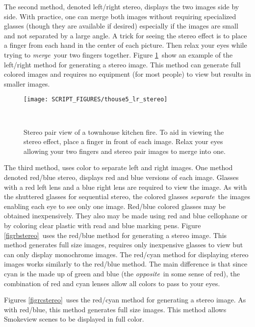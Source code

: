 \documentclass[11pt,twoside]{book}
\begin{document}
The second method, denoted left/right stereo, displays the two
images side by side.  With practice, one can merge both images
without requiring specialized glasses (though they are available
if desired) especially if the images are small and not separated
by a large angle. A trick for seeing the stereo effect is to place
a finger from each hand in the center of each picture.  Then relax
your eyes while trying to {\em merge}\ your two fingers together.
Figure \ref{figlrstereo}\ show an example of the left/right method
for generating a stereo image.  This method can generate full
colored images and requires no equipment (for most people) to view
but results in smaller images.
\begin{figure}[bph]
\begin{center}
\texttt{[image: SCRIPT\_FIGURES/thouse5\_lr\_stereo]}
\caption[Stereo pair view of a townhouse kitchen fire.]{ Stereo
pair view of a townhouse kitchen fire. To aid in viewing the
stereo effect, place a finger in front of each image.  Relax your
eyes allowing your two fingers and stereo pair images to merge
into one. }\ \label{figlrstereo}
\end{center}
\end{figure}

The third method, uses color to separate left and right images.
One method denoted red/blue stereo, displays red and blue versions
of each image.  Glasses with a red left lens and a blue right lens
are required to view the image.  As with the shuttered glasses for
sequential stereo, the colored glasses {\em separate}\ the images
enabling each eye to see only one image.  Red/blue colored glasses
may be obtained inexpensively. They also may be made using
red and blue cellophane or by coloring clear plastic with read and
blue marking pens.  Figure \ref{figrbstereo}\ uses the red/blue
method for generating a stereo image.  This method generates full
size images, requires only inexpensive glasses to view but can
only display monochrome images. The red/cyan method for displaying
stereo images works similarly to the red/blue method.  The main
difference is that since cyan is the made up of green and blue
(the {\em opposite}\ in some sense of red), the combination of red
and cyan lenses allow all colors to pass to your eyes.

Figures \ref{figrcstereo}\ uses the red/cyan method for generating
a stereo image.  As with red/blue, this method generates full size
images.  This method allows Smokeview
scenes to be displayed in full color.
\end{document}
